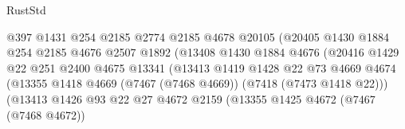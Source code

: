 \begin{lexlean}{RustStd}
\begin{coremodule}
                                        @397
                                        @1431
                                        @254
                                        @2185
                                        @2774
                                        @2185
                                        @4678
                                        @20105
                                        (@20405
                                          @1430
                                          @1884
                                          @254
                                          @2185
                                          @4676
                                          @2507
                                          @1892
                                          (@13408
                                            @1430
                                            @1884
                                            @4676
                                            (@20416
                                              @1429
                                              @22
                                              @251
                                              @2400
                                              @4675
                                              @13341
                                              (@13413
                                                @1419
                                                @1428
                                                @22
                                                @73
                                                @4669
                                                @4674
                                                (@13355
                                                  @1418
                                                  @4669
                                                  (@7467 (@7468 @4669))
                                                  (@7418 (@7473 @1418 @22)))
                                                (@13413
                                                  @1426
                                                  @93
                                                  @22
                                                  @27
                                                  @4672
                                                  @2159
                                                  (@13355
                                                    @1425
                                                    @4672
                                                    (@7467 (@7468 @4672))

\end{coremodule}
\end{lexlean}
